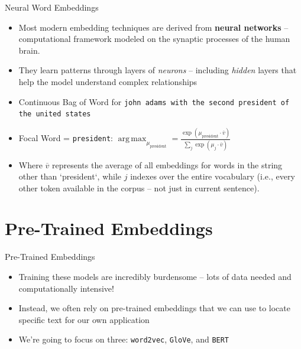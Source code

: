 \documentclass[
  ignorenonframetext,
  aspectratio=169]{beamer}
\begin{document}
\begin{frame}{Neural Word Embeddings}
\label{neural-word-embeddings}
\begin{itemize}
\item Most modern embedding techniques are derived from \textbf{neural networks} -- computational framework modeled on the synaptic processes of the human brain.  \par \vspace{2.5mm} 
\item They learn patterns through layers of \emph{neurons} -- including \emph{hidden} layers that help the model understand complex relationships \par \vspace{2.5mm} \pause
\item Continuous Bag of Word for \texttt{john adams with the second president of the united states} \par \vspace{2.5mm}
\item[] Focal Word = \texttt{president}:  $\operatorname*{arg\,max}_{\mu_{\text{president}}} = \frac{\exp(\mu_{\text{president}}\cdot\overline{v})}{\sum_{j}\exp(\mu_{j}\cdot\overline{v})}$ \vspace{2.5mm} \par 
\item Where $\overline{v}$ represents the average of all embeddings for words in the string other than `president`, while $j$ indexes over the entire vocabulary (i.e., every other token available in the corpus -- not just in current sentence).
\end{itemize}
\end{frame}

\section{Pre-Trained Embeddings}\label{pre-trained-embeddings}

\begin{frame}{Pre-Trained Embeddings}
\label{pre-trained-embeddings-1}
\begin{itemize}
\item Training these models are incredibly burdensome -- lots of data needed and computationally intensive! \par \vspace{2.5mm}
\item Instead, we often rely on pre-trained embeddings that we can use to locate specific text for our own application  \par \vspace{2.5mm}
\item We're going to focus on three: \texttt{word2vec}, \texttt{GloVe}, and \texttt{BERT}
\end{itemize}
\end{frame}
\end{document}
